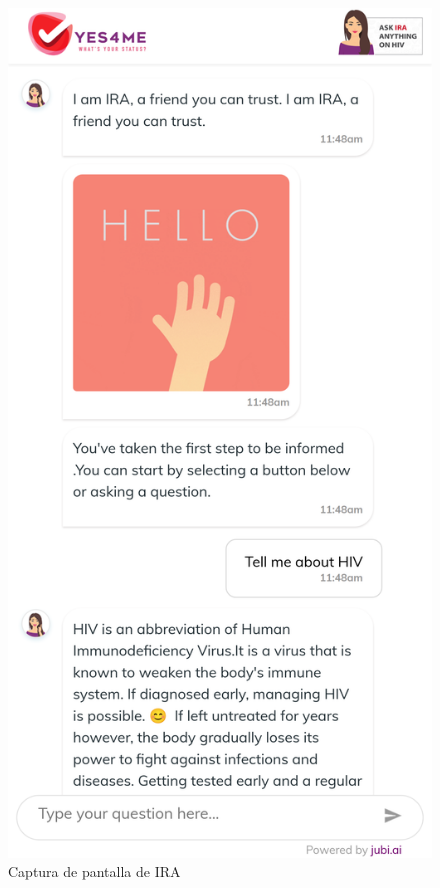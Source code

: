 \begin{figure}[htbp]
\centering
\includegraphics[scale=0.1]{../images/ira.png} 
\caption{Captura de pantalla de IRA}
\label{fig:x captura ira}
\end{figure}

